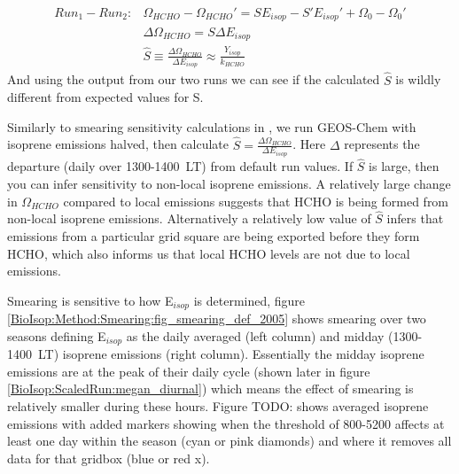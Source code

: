       \begin{eqnarray}
        \label{BioIsop:Method:Smearing:calculation:eqn_hats}
        Run_1-Run_2 :& \Omega_{HCHO} - \Omega_{HCHO}' = S E_{isop} - S' E_{isop}' +\Omega_0 - \Omega_0' \\
        & \Delta \Omega_{HCHO} = S \Delta E_{isop} \\
        & \hat{S} \equiv \frac{\Delta{\Omega_{HCHO}}}{\Delta E_{isop}} \approx \frac{Y_{isop}}{k_{HCHO}}
      \end{eqnarray}
      And using the output from our two runs we can see if the calculated $\hat{S}$ is wildly different from expected values for S.
      
      
      Similarly to smearing sensitivity calculations in \textcite{Marais2012}, we run GEOS-Chem with isoprene emissions halved, then calculate $\hat{S} = \frac{\Delta \Omega_{HCHO}}{\Delta E_{isop}} $.
      Here $\Delta$ represents the departure (daily over 1300-1400~LT) from default run values.
      If $\hat{S}$ is large, then you can infer sensitivity to non-local isoprene emissions.
      A relatively large change in $\Omega_{HCHO}$ compared to local emissions suggests that HCHO is being formed from non-local isoprene emissions.
      Alternatively a relatively low value of $\hat{S}$ infers that emissions from a particular grid square are being exported before they form HCHO, which also informs us that local HCHO levels are not due to local emissions.
      
      Smearing is sensitive to how E$_{isop}$ is determined, figure \ref{BioIsop:Method:Smearing:fig_smearing_def_2005} shows smearing over two seasons defining E$_{isop}$ as the daily averaged (left column) and midday (1300-1400~LT) isoprene emissions (right column). 
      Essentially the midday isoprene emissions are at the peak of their daily cycle (shown later in figure \ref{BioIsop:ScaledRun:megan_diurnal}) which means the effect of smearing is relatively smaller during these hours.
      Figure TODO: shows averaged isoprene emissions with added markers showing when the threshold of 800-5200 affects at least one day within the season (cyan or pink diamonds) and where it removes all data for that gridbox (blue or red x).
      
      
      
